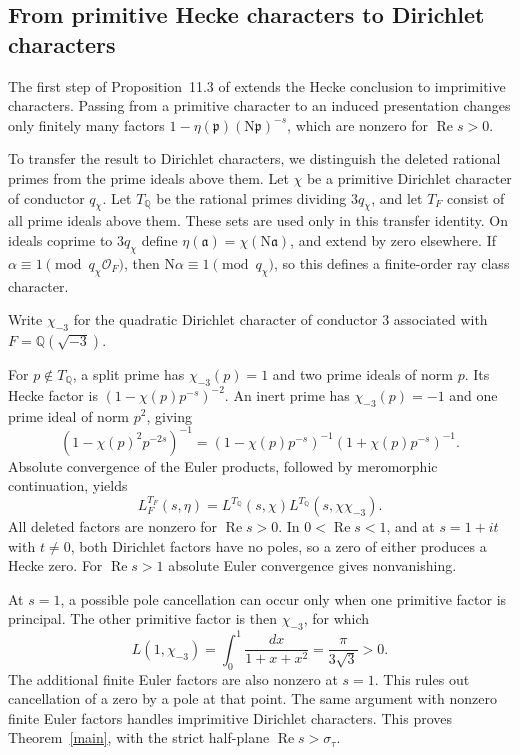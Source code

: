 \documentclass[10pt,reqno,a4paper]{amsart}
\theoremstyle{remark}
\newcommand{\N}{\mathrm N}
\newcommand{\Rea}{\operatorname{Re}}
\newcommand{\pp}{\mathfrak p}
\newcommand{\OO}{\mathcal O_F}
\newcommand{\st}{\sigma_\tau}
\begin{document}
\subsection*{From primitive Hecke characters to Dirichlet characters}

The first step of Proposition~11.3 of \cite{q30} extends the
Hecke conclusion to imprimitive characters. Passing from a
primitive character to an induced presentation changes only
finitely many factors
$1-\eta(\pp)(\N\pp)^{-s}$, which are nonzero for $\Rea s>0$.

To transfer the result to Dirichlet characters, we distinguish the
deleted rational primes from the prime ideals above them. Let $\chi$ be a primitive Dirichlet character of
conductor $q_\chi$. Let $T_{\mathbb Q}$ be the rational primes
dividing $3q_\chi$, and let $T_F$ consist of all prime ideals
above them. These sets are used only in this transfer identity.
On ideals coprime to $3q_\chi$ define
$\eta(\mathfrak a)=\chi(\N\mathfrak a)$, and extend by zero
elsewhere. If $\alpha\equiv1\pmod{q_\chi\OO}$, then
$\N\alpha\equiv1\pmod{q_\chi}$, so this defines a finite-order
ray class character.

Write $\chi_{-3}$ for the quadratic Dirichlet character of conductor $3$ associated with $F=\mathbb Q(\sqrt{-3})$.

For $p\notin T_{\mathbb Q}$, a split prime has
$\chi_{-3}(p)=1$ and two prime ideals of norm $p$. Its Hecke
factor is $(1-\chi(p)p^{-s})^{-2}$. An inert prime has
$\chi_{-3}(p)=-1$ and one prime ideal of norm $p^2$, giving
\[
 (1-\chi(p)^2p^{-2s})^{-1}
       =(1-\chi(p)p^{-s})^{-1}(1+\chi(p)p^{-s})^{-1}.
\]
Absolute convergence of the Euler products, followed by
meromorphic continuation, yields
\begin{equation}\label{dirichlet-transfer}
 L_F^{T_F}(s,\eta)
      =L^{T_{\mathbb Q}}(s,\chi)
         L^{T_{\mathbb Q}}(s,\chi\chi_{-3}).
\end{equation}
All deleted factors are nonzero for $\Rea s>0$. In
$0<\Rea s<1$, and at $s=1+it$ with $t\ne0$, both Dirichlet
factors have no poles, so a zero of either produces a Hecke zero.
For $\Rea s>1$ absolute Euler convergence gives nonvanishing.

At $s=1$, a possible pole cancellation can occur only when one
primitive factor is principal. The other primitive factor is then
$\chi_{-3}$, for which
\[
        L(1,\chi_{-3})=\int_0^1\frac{dx}{1+x+x^2}
                          =\frac{\pi}{3\sqrt3}>0.
\]
The additional finite Euler factors are also nonzero at $s=1$.
This rules out cancellation of a zero by a pole at that point.
The same argument with nonzero finite Euler factors handles
imprimitive Dirichlet characters. This proves
Theorem~\ref{main}, with the strict half-plane $\Rea s>\st$.
\end{document}
